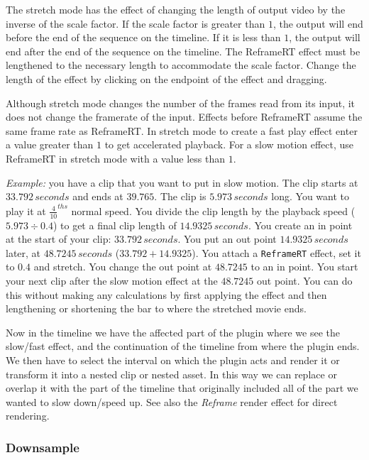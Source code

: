 The stretch mode has the effect of changing the length of output video by the inverse of the scale factor. If the scale factor is greater than $1$, the output will end before the end of the sequence on the timeline. If it is less than $1$, the output will end after the end of the sequence on the timeline. The ReframeRT effect must be lengthened to the necessary length to accommodate the scale factor. Change the length of the effect by clicking on the endpoint of the effect and dragging.

Although stretch mode changes the number of the frames read from its
input, it does not change the framerate of the input. Effects before
ReframeRT assume the same frame rate as ReframeRT\@.  In stretch
mode to create a fast play effect enter a value greater than $1$ to
get accelerated playback.  For a slow motion effect, use ReframeRT
in stretch mode with a value less than $1$.

\textit{Example:} you have a clip that you want to put in slow motion. The clip starts at $33.792\, seconds$ and ends at $39.765$. The clip is $5.973\, seconds$ long. You want to play it at $\frac{4}{10}^{ths}$ normal speed. You divide the clip length by the playback speed ($5.973\div0.4$) to get a final clip length of $14.9325\,seconds$. You create an in point at the start of your clip: $33.792\,seconds$. You put an out point $14.9325\,seconds$ later, at $48.7245\,seconds$ ($33.792 + 14.9325$). You attach a \texttt{ReframeRT} effect, set it to $0.4$ and stretch. You change the out point at $48.7245$ to an in point. You start your next clip after the slow motion effect at the $48.7245$ out point. You can do this without making any calculations by first applying the effect and then lengthening or shortening the bar to where the stretched movie ends.

Now in the timeline we have the affected part of the plugin where we see the slow/fast effect, and the continuation of the timeline from where the plugin ends. We then have to select the interval on which the plugin acts and render it or transform it into a nested clip or nested asset. In this way we can replace or overlap it with the part of the timeline that originally included all of the part we wanted to slow down/speed up. See also the \textit{Reframe} render effect for direct rendering.

\subsubsection*{Downsample}%
\label{ssub:downsample}

